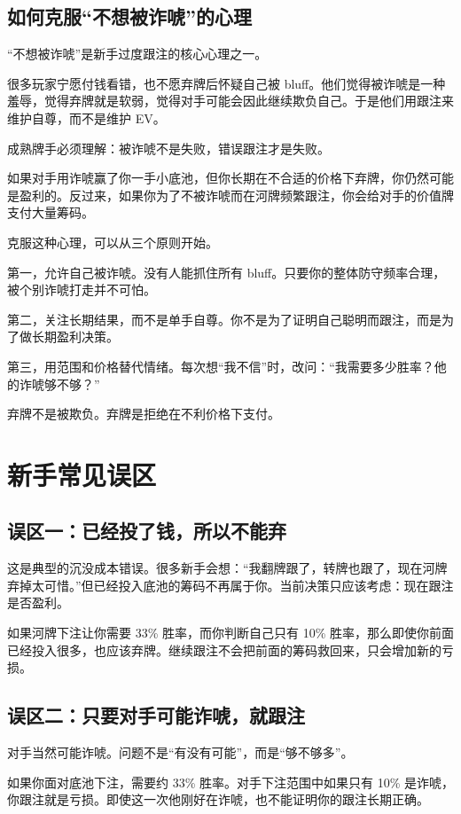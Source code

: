\subsection{如何克服“不想被诈唬”的心理}

“不想被诈唬”是新手过度跟注的核心心理之一。

很多玩家宁愿付钱看错，也不愿弃牌后怀疑自己被 bluff。他们觉得被诈唬是一种羞辱，觉得弃牌就是软弱，觉得对手可能会因此继续欺负自己。于是他们用跟注来维护自尊，而不是维护 EV。

成熟牌手必须理解：被诈唬不是失败，错误跟注才是失败。

如果对手用诈唬赢了你一手小底池，但你长期在不合适的价格下弃牌，你仍然可能是盈利的。反过来，如果你为了不被诈唬而在河牌频繁跟注，你会给对手的价值牌支付大量筹码。

克服这种心理，可以从三个原则开始。

第一，允许自己被诈唬。没有人能抓住所有 bluff。只要你的整体防守频率合理，被个别诈唬打走并不可怕。

第二，关注长期结果，而不是单手自尊。你不是为了证明自己聪明而跟注，而是为了做长期盈利决策。

第三，用范围和价格替代情绪。每次想“我不信”时，改问：“我需要多少胜率？他的诈唬够不够？”

弃牌不是被欺负。弃牌是拒绝在不利价格下支付。

\section{新手常见误区}

\subsection{误区一：已经投了钱，所以不能弃}

这是典型的沉没成本错误。很多新手会想：“我翻牌跟了，转牌也跟了，现在河牌弃掉太可惜。”但已经投入底池的筹码不再属于你。当前决策只应该考虑：现在跟注是否盈利。

如果河牌下注让你需要 33\% 胜率，而你判断自己只有 10\% 胜率，那么即使你前面已经投入很多，也应该弃牌。继续跟注不会把前面的筹码救回来，只会增加新的亏损。

\subsection{误区二：只要对手可能诈唬，就跟注}

对手当然可能诈唬。问题不是“有没有可能”，而是“够不够多”。

如果你面对底池下注，需要约 33\% 胜率。对手下注范围中如果只有 10\% 是诈唬，你跟注就是亏损。即使这一次他刚好在诈唬，也不能证明你的跟注长期正确。

